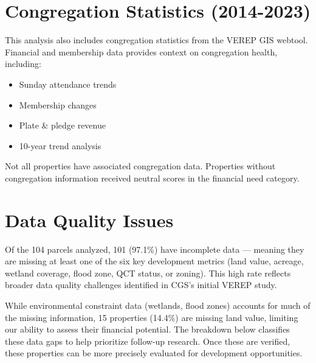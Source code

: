 \documentclass[
  letterpaper,
  DIV=11,
  numbers=noendperiod,
  oneside]{scrreprt}
\providecommand{\tightlist}{%
  \setlength{\itemsep}{0pt}\setlength{\parskip}{0pt}}
\begin{document}
\section{Congregation Statistics
(2014-2023)}\label{congregation-statistics-2014-2023}

This analysis also includes congregation statistics from the VEREP GIS
webtool. Financial and membership data provides context on congregation
health, including:

\begin{itemize}
\tightlist
\item
  Sunday attendance trends
\item
  Membership changes
\item
  Plate \& pledge revenue
\item
  10-year trend analysis
\end{itemize}

\begin{tcolorbox}[enhanced jigsaw, bottomtitle=1mm, left=2mm, rightrule=.15mm, colbacktitle=quarto-callout-note-color!10!white, arc=.35mm, title=\textcolor{quarto-callout-note-color}{\faInfo}\hspace{0.5em}{Data Quality Note}, bottomrule=.15mm, colback=white, colframe=quarto-callout-note-color-frame, leftrule=.75mm, titlerule=0mm, opacitybacktitle=0.6, breakable, coltitle=black, toptitle=1mm, toprule=.15mm, opacityback=0]

Not all properties have associated congregation data. Properties without
congregation information received neutral scores in the financial need
category.

\end{tcolorbox}

\section{Data Quality Issues}\label{data-quality-issues}

Of the 104 parcels analyzed, 101 (97.1\%) have incomplete data ---
meaning they are missing at least one of the six key development metrics
(land value, acreage, wetland coverage, flood zone, QCT status, or
zoning). This high rate reflects broader data quality challenges
identified in CGS's initial VEREP study.

While environmental constraint data (wetlands, flood zones) accounts for
much of the missing information, 15 properties (14.4\%) are missing land
value, limiting our ability to assess their financial potential. The
breakdown below classifies these data gaps to help prioritize follow-up
research. Once these are verified, these properties can be more
precisely evaluated for development opportunities.
\end{document}
